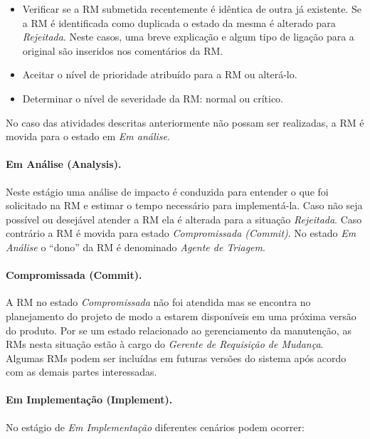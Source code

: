 \begin{itemize}
	\item Verificar se a RM submetida recentemente é idêntica de outra já
		existente. Se a RM é identificada como duplicada o estado da mesma é
		alterado para \textit{Rejeitada}. Neste casos, uma breve explicação e
		algum tipo de ligação para a original são inseridos nos comentários da
		RM\@.
	\item Aceitar o nível de prioridade atribuído para a RM ou alterá-lo.
	\item Determinar o nível de severidade da RM\@: normal ou crítico.
\end{itemize}

No caso das atividades descritas anteriormente não possam ser
re\-a\-li\-za\-das, a RM é movida para o estado em \textit{Em análise}.

\paragraph{Em Análise (Analysis).}
\label{par:em_analise}
Neste estágio uma análise de impacto é conduzida para entender o que foi
solicitado na RM e estimar o tempo necessário para implementá-la. Caso não seja
possível ou desejável atender a RM ela é alterada para a situação
\textit{Rejeitada}. Caso contrário a RM é movida para estado
\textit{Compromissada (Commit)}. No estado \textit{Em Análise} o ``dono'' da RM
é denominado \textit{Agente de Triagem}.

\paragraph{Compromissada (Commit).}
\label{par:commit}

A RM no estado \textit{Compromissada} não foi atendida mas se encontra no
planejamento do projeto de modo a estarem disponíveis em uma próxima versão do
produto. Por se um estado relacionado ao gerenciamento da manutenção, as RMs
nesta situação estão à cargo do \textit{Gerente de Requisição de Mudança}.
Algumas RMs podem ser incluídas em futuras versões do sistema após acordo com as
demais partes interessadas.

\paragraph{Em Implementação (Implement).}
\label{par:em_implementacao}

No estágio de \textit{Em Implementação} diferentes cenários podem ocorrer:

